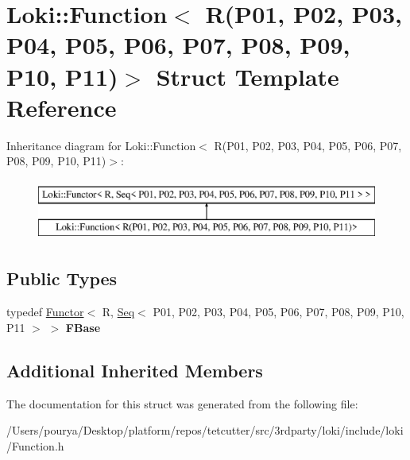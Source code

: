 \hypertarget{structLoki_1_1Function_3_01R_07P01_00_01P02_00_01P03_00_01P04_00_01P05_00_01P06_00_01P07_00_01P0a6217492d252c71a7ad78695e04652dc}{}\section{Loki\+:\+:Function$<$ R(P01, P02, P03, P04, P05, P06, P07, P08, P09, P10, P11)$>$ Struct Template Reference}
\label{structLoki_1_1Function_3_01R_07P01_00_01P02_00_01P03_00_01P04_00_01P05_00_01P06_00_01P07_00_01P0a6217492d252c71a7ad78695e04652dc}
Inheritance diagram for Loki\+:\+:Function$<$ R(P01, P02, P03, P04, P05, P06, P07, P08, P09, P10, P11)$>$\+:\begin{figure}[H]
\begin{center}
\leavevmode
\includegraphics[height=2.000000cm]{structLoki_1_1Function_3_01R_07P01_00_01P02_00_01P03_00_01P04_00_01P05_00_01P06_00_01P07_00_01P0a6217492d252c71a7ad78695e04652dc}
\end{center}
\end{figure}
\subsection*{Public Types}
\begin{DoxyCompactItemize}
\item 
\hypertarget{structLoki_1_1Function_3_01R_07P01_00_01P02_00_01P03_00_01P04_00_01P05_00_01P06_00_01P07_00_01P0a6217492d252c71a7ad78695e04652dc_acd24658d7e6153d910fccdf11e138c2c}{}typedef \hyperlink{classLoki_1_1Functor}{Functor}$<$ R, \hyperlink{structLoki_1_1Seq}{Seq}$<$ P01, P02, P03, P04, P05, P06, P07, P08, P09, P10, P11 $>$ $>$ {\bfseries F\+Base}\label{structLoki_1_1Function_3_01R_07P01_00_01P02_00_01P03_00_01P04_00_01P05_00_01P06_00_01P07_00_01P0a6217492d252c71a7ad78695e04652dc_acd24658d7e6153d910fccdf11e138c2c}

\end{DoxyCompactItemize}
\subsection*{Additional Inherited Members}


The documentation for this struct was generated from the following file\+:\begin{DoxyCompactItemize}
\item 
/\+Users/pourya/\+Desktop/platform/repos/tetcutter/src/3rdparty/loki/include/loki/Function.\+h\end{DoxyCompactItemize}
